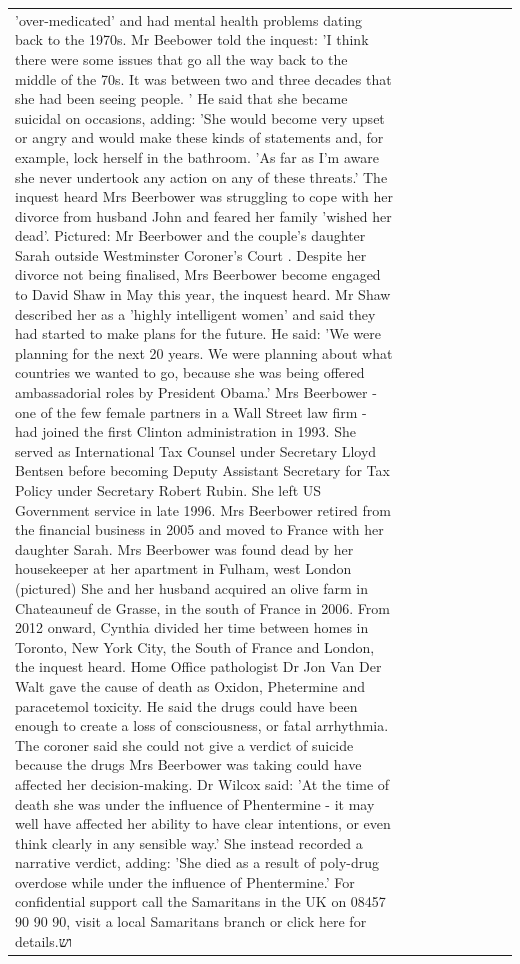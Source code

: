 \begin{table}[H]
\begin{tabular}{lllrlllll}
'over-medicated' and had mental health problems dating back to the 1970s. Mr Beebower told the inquest: 'I think there were some issues that go all the way back to the middle of the 70s. It was between two and three decades that she had been seeing people. ' He said that she became suicidal on occasions, adding: 'She would become very upset or angry and would make these kinds of statements and, for example, lock herself in the bathroom. 'As far as I'm aware she never undertook any action on any of these threats.' The inquest heard Mrs Beerbower was struggling to cope with her divorce from husband John and feared her family 'wished her dead'. Pictured: Mr Beerbower and the couple's daughter Sarah outside Westminster Coroner's Court . Despite her divorce not being finalised, Mrs Beerbower become engaged to David Shaw in May this year, the inquest heard. Mr Shaw described her as a 'highly intelligent women' and said they had started to make plans for the future. He said: 'We were planning for the next 20 years. We were planning about what countries we wanted to go, because she was being offered ambassadorial roles by President Obama.' Mrs Beerbower - one of the few female partners in a Wall Street law firm - had joined the first Clinton administration in 1993. She served as International Tax Counsel under Secretary Lloyd Bentsen before becoming Deputy Assistant Secretary for Tax Policy under Secretary Robert Rubin. She left US Government service in late 1996. Mrs Beerbower retired from the financial business in 2005 and moved to France with her daughter Sarah. Mrs Beerbower was found dead by her housekeeper at her apartment in Fulham, west London (pictured) She and her husband acquired an olive farm in Chateauneuf de Grasse, in the south of France in 2006. From 2012 onward, Cynthia divided her time between homes in Toronto, New York City, the South of France and London, the inquest heard. Home Office pathologist Dr Jon Van Der Walt gave the cause of death as Oxidon, Phetermine and paracetemol toxicity. He said the drugs could have been enough to create a loss of consciousness, or fatal arrhythmia. The coroner said she could not give a verdict of suicide because the drugs Mrs Beerbower was taking could have affected her decision-making. Dr Wilcox said: 'At the time of death she was under the influence of Phentermine - it may well have affected her ability to have clear intentions, or even think clearly in any sensible way.' She instead recorded a narrative verdict, adding: 'She died as a result of poly-drug overdose while under the influence of Phentermine.' For confidential support call the Samaritans in the UK on 08457 90 90 90, visit a local Samaritans branch or click here for details.וש \\

\end{tabular}
\end{table}
